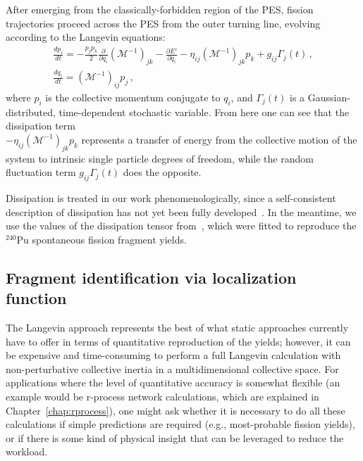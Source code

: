 After emerging from the classically-forbidden region of the PES, fission trajectories proceed across the PES from the outer turning line, evolving according to the Langevin equations:
\begin{gather}\label{eq:langevin} 
	\frac{dp_i}{dt} =  
	-\frac{p_j p_k}{2} \frac{\partial}{\partial q_i}\left(\mathcal{M}^{-1}\right)_{jk} 
	- \frac{\partial E'}{\partial q_i}  - \eta_{ij}\left(\mathcal{M}^{-1}\right)_{jk} p_k + g_{ij}\Gamma_j(t) \,, \\ 
	\frac{dq_i}{dt} = 	\left(\mathcal{M}^{-1}\right)_{ij} p_j \,,  
\end{gather} 
\noindent where $p_i$ is the collective momentum conjugate to $q_i$, and $\Gamma_j(t)$ is a Gaussian-distributed, time-dependent stochastic variable. From here one can see that the dissipation term\\\noindent $- \eta_{ij}\left(\mathcal{M}^{-1}\right)_{jk} p_k$ represents a transfer of energy from the collective motion of the system to intrinsic single particle degrees of freedom, while the random fluctuation term $g_{ij}\Gamma_j(t)$ does the opposite.

Dissipation is treated in our work phenomenologically, since a self-consistent description of dissipation has not yet been fully developed~\cite{Bulgac2018a}.  In the meantime, we use the values of the dissipation tensor from~\cite{Sadhukhan2016}, which were fitted to reproduce the $^{240}$Pu spontaneous fission fragment yields.%

\subsection{Fragment identification via localization function}\label{sect:FragID}
The Langevin approach represents the best of what static approaches currently have to offer in terms of quantitative reproduction of the yields; however, it can be expensive and time-consuming to perform a full Langevin calculation with non-perturbative collective inertia in a multidimensional collective space. For applications where the level of quantitative accuracy is somewhat flexible (an example would be r-process network calculations, which are explained in Chapter~\ref{chap:rprocess}), one might ask whether it is necessary to do all these calculations if simple predictions are required (e.g., most-probable fission yields), or if there is some kind of physical insight that can be leveraged to reduce the workload.

